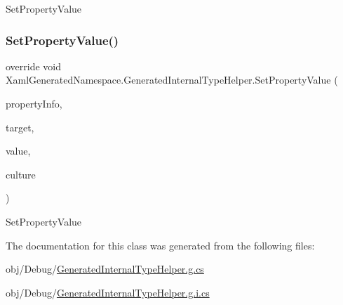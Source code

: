 Set\+Property\+Value 

\mbox{\label{class_xaml_generated_namespace_1_1_generated_internal_type_helper_ade0f04c0f7b18dd5b170e071d5534d38}} 
\subsubsection{\texorpdfstring{Set\+Property\+Value()}{SetPropertyValue()}\hspace{0.1cm}{\footnotesize\ttfamily [4/4]}}
{\footnotesize\ttfamily override void Xaml\+Generated\+Namespace.\+Generated\+Internal\+Type\+Helper.\+Set\+Property\+Value (\begin{DoxyParamCaption}\item[{System.\+Reflection.\+Property\+Info}]{property\+Info,  }\item[{object}]{target,  }\item[{object}]{value,  }\item[{System.\+Globalization.\+Culture\+Info}]{culture }\end{DoxyParamCaption})\hspace{0.3cm}{\ttfamily [protected]}}



Set\+Property\+Value 



The documentation for this class was generated from the following files\+:\begin{DoxyCompactItemize}
\item 
obj/\+Debug/\hyperlink{_debug_2_generated_internal_type_helper_8g_8cs}{Generated\+Internal\+Type\+Helper.\+g.\+cs}\item 
obj/\+Debug/\hyperlink{_debug_2_generated_internal_type_helper_8g_8i_8cs}{Generated\+Internal\+Type\+Helper.\+g.\+i.\+cs}\end{DoxyCompactItemize}
